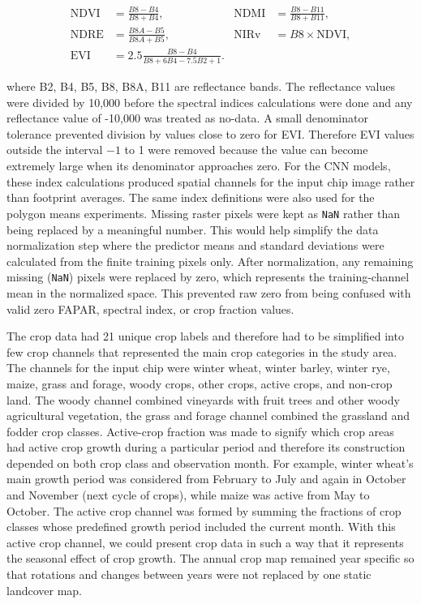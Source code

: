 \begin{align}
    \mathrm{NDVI} &= \frac{B8-B4}{B8+B4}, &
    \mathrm{NDMI} &= \frac{B8-B11}{B8+B11}, \nonumber\\
    \mathrm{NDRE} &= \frac{B8A-B5}{B8A+B5}, &
    \mathrm{NIRv} &= B8\times\mathrm{NDVI}, \nonumber\\
    \mathrm{EVI} &= 2.5\frac{B8-B4}{B8+6B4-7.5B2+1}.
    \label{eq:sentinel_indices}
\end{align}

where B2, B4, B5, B8, B8A, B11 are reflectance bands. The reflectance values were divided by 10,000 before the spectral indices calculations were done and any reflectance value of -10,000 was treated as no-data. A small denominator tolerance prevented division by values close to zero for EVI. Therefore EVI values outside the interval $-1$ to 1 were removed because the value can become extremely large when its denominator approaches zero. For the CNN models, these index calculations produced spatial channels for the input chip image rather than footprint averages. The same index definitions were also used for the polygon means experiments. Missing raster pixels were kept as \texttt{NaN} rather than being replaced by a meaningful number. This would help simplify the data normalization step where the predictor means and standard deviations were calculated from the finite training pixels only. After normalization, any remaining missing (\texttt{NaN}) pixels were replaced by zero, which represents the training-channel mean in the normalized space. This prevented raw zero from being confused with valid zero FAPAR, spectral index, or crop fraction values.

The crop data had 21 unique crop labels and therefore had to be simplified into few crop channels that represented the main crop categories in the study area. The channels for the input chip were winter wheat, winter barley, winter rye, maize, grass and forage, woody crops, other crops, active crops, and non-crop land. The woody channel combined vineyards with fruit trees and other woody agricultural vegetation, the grass and forage channel combined the grassland and fodder crop classes. Active-crop fraction was made to signify which crop areas had active crop growth during a particular period and therefore its construction depended on both crop class and observation month. For example, winter wheat's main growth period was considered from February to July and again in October and November (next cycle of crops), while maize was active from May to October. The active crop channel was formed by summing the fractions of crop classes whose predefined growth period included the current month. With this active crop channel, we could present crop data in such a way that it represents the seasonal effect of crop growth. The annual crop map remained year specific so that rotations and changes between years were not replaced by one static landcover map.


